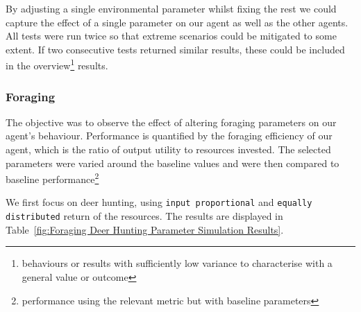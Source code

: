 By adjusting a single environmental parameter whilst fixing the rest we could capture the effect of a single parameter on our agent as well as the other agents. All tests were run twice so that extreme scenarios could be mitigated to some extent. If two consecutive tests returned similar results, these could be included in the overview\footnote{behaviours or results with sufficiently low variance to characterise with a general value or outcome} results.


\subsubsection{Foraging}

The objective was to observe the effect of altering foraging parameters on our agent's behaviour. Performance is quantified by the foraging efficiency of our agent, which is the ratio of output utility to resources invested. The selected parameters were varied around the baseline values and were then compared to baseline performance\footnote{performance using the relevant metric but with baseline parameters}

We first focus on deer hunting, using  \texttt{input proportional} and \texttt{equally distributed} return of the resources. The results are displayed in Table~\ref{fig:Foraging Deer Hunting Parameter Simulation Results}.

